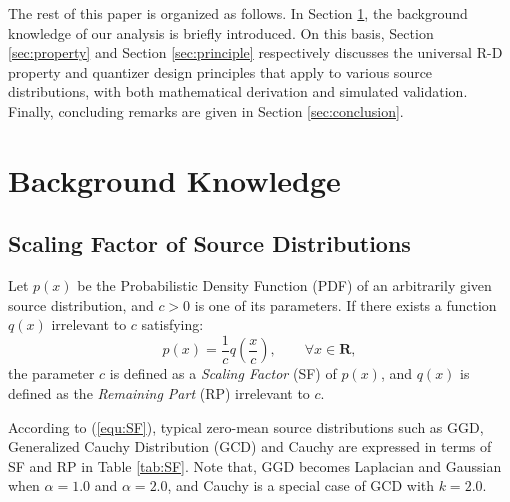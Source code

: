 \documentclass[smallabstract,smallcaptions]{dccpaper}
\begin{document}
The rest of this paper is organized as follows. In Section \ref{sec:background}, the background knowledge of our analysis is briefly introduced. On this basis, Section \ref{sec:property} and Section \ref{sec:principle} respectively discusses the universal R-D property and quantizer design principles that apply to various source distributions, with both mathematical derivation and simulated validation. Finally, concluding remarks are given in Section \ref{sec:conclusion}.

\section{Background Knowledge}
\label{sec:background}

\subsection{Scaling Factor of Source Distributions}

Let $p(x)$ be the Probabilistic Density Function (PDF) of an arbitrarily given source distribution, and $c>0$ is one of its parameters. If there exists a function $q(x)$ irrelevant to $c$ satisfying:
\begin{equation}
\label{equ:SF}
p(x)=\frac{1}{c} q(\frac{x}{c}),\qquad \forall x \in \mathbf{R},
\end{equation}
the parameter $c$ is defined as a \emph{Scaling Factor} (SF) of $p(x)$, and $q(x)$ is defined as the \emph{Remaining Part} (RP) irrelevant to $c$.

According to (\ref{equ:SF}), typical zero-mean source distributions such as GGD, Generalized Cauchy Distribution (GCD) and Cauchy are expressed in terms of SF and RP in Table \ref{tab:SF}. Note that, GGD becomes Laplacian and Gaussian when $\alpha=1.0$ and $\alpha=2.0$, and Cauchy is a special case of GCD with $k=2.0$.
\end{document}
